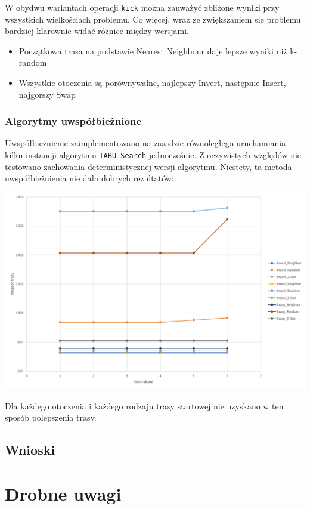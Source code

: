 \documentclass{article}
\begin{document}
W obydwu wariantach operacji \texttt{kick} można zauważyć zbliżone wyniki przy wszystkich wielkościach problemu. Co więcej, wraz ze zwiększaniem się problemu bardziej klarownie widać różnice między wersjami. 
\begin{itemize}
	\item Początkowa trasa na podstawie Nearest Neighbour daje lepsze wyniki niż k-random
	\item Wszystkie otoczenia są porównywalne, najlepszy Invert, następnie Insert, najgorszy Swap
\end{itemize}

\newpage
\subsubsection{Algorytmy uwspółbieżnione}

Uwspółbieżnienie zaimplementowano na zasadzie równoległego uruchamiania kilku instancji algorytmu \texttt{TABU-Search} jednocześnie. Z oczywistych względów nie testowano zachowania deterministycznej wersji algorytmu. Niestety, ta metoda uwspółbieżnienia nie dała dobrych rezultatów:

\includegraphics[scale=0.4]{parallel_n=70}

Dla każdego otoczenia i każdego rodzaju trasy startowej nie uzyskano w ten sposób polepszenia trasy.



\subsection{Wnioski}


\section*{Drobne uwagi}
\end{document}
